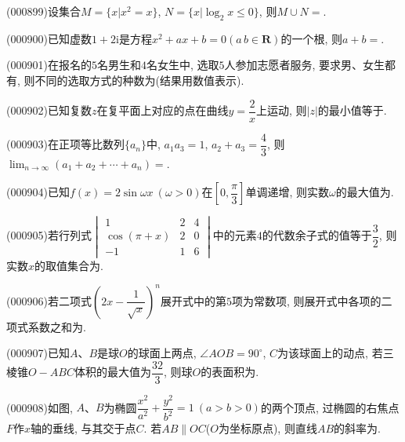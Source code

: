 \item (000899)设集合$M=\{x|x^2=x\}$, $N=\{x|\log_2 x\le 0\}$, 则$M\cup N=$.
\item (000900)已知虚数$1+2\mathrm{i}$是方程$x^2+ax+b=0 (a\,b\in \mathbf{R})$的一个根, 则$a+b=$.
\item (000901)在报名的$5$名男生和$4$名女生中, 选取$5$人参加志愿者服务, 要求男、女生都有, 则不同的选取方式的种数为(结果用数值表示).
\item (000902)已知复数$z$在复平面上对应的点在曲线$y=\dfrac 2 x$上运动, 则$|z|$的最小值等于.
\item (000903)在正项等比数列$\{a_n\}$中, $a_1a_3=1$, $a_2+a_3=\dfrac43$, 则$\displaystyle\lim_{n\to\infty}(a_1+a_2+\cdots +a_n)=$.
\item (000904)已知$f(x)=2 \sin \omega x\ (\omega >0)$在$[0,\dfrac\pi 3]$单调递增, 则实数$\omega$的最大值为.
\item (000905)若行列式$\begin{vmatrix}   1 & 2 & 4 \\   \cos (\pi +x) & 2 & 0 \\   -1 & 1 & 6 \end{vmatrix}$中的元素$4$的代数余子式的值等于$\dfrac32$, 则实数$x$的取值集合为.
\item (000906)若二项式$(2x-\dfrac1{\sqrt x})^n$展开式中的第$5$项为常数项, 则展开式中各项的二项式系数之和为.
\item (000907)已知$A$、$B$是球$O$的球面上两点, $\angle AOB=90^\circ$, $C$为该球面上的动点, 若三棱锥$O-ABC$体积的最大值为$\dfrac{32}{3}$, 则球$O$的表面积为.
\begin{center}
\end{center}
\item (000908)如图, $A$、$B$为椭圆$\dfrac{x^2}{a^2}+\dfrac{y^2}{b^2}=1 \ (a>b>0)$的两个顶点, 过椭圆的右焦点$F$作$x$轴的垂线, 与其交于点$C$. 若$AB\parallel OC$($O$为坐标原点), 则直线$AB$的斜率为.
